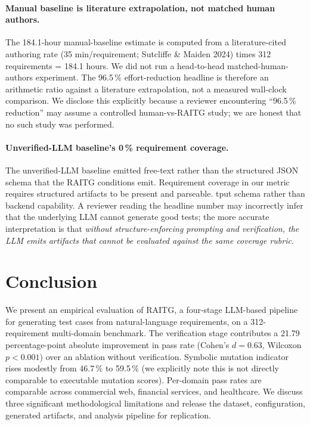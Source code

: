 \documentclass[10pt,twocolumn,letterpaper]{article}
\begin{document}
\paragraph{Manual baseline is literature extrapolation, not matched
human authors.} The 184.1-hour manual-baseline estimate is computed from a literature-cited
authoring rate (35 min/requirement; Sutcliffe \& Maiden 2024) times
312 requirements = 184.1 hours. We did not run a head-to-head
matched-human-authors experiment. The 96.5\,\% effort-reduction
headline is therefore an arithmetic ratio against a literature
extrapolation, not a measured wall-clock comparison. We disclose this
explicitly because a reviewer encountering ``96.5\,\% reduction'' may
assume a controlled human-vs-RAITG study; we are honest that no such
study was performed.

\paragraph{Unverified-LLM baseline's 0\,\% requirement coverage.} The
unverified-LLM baseline emitted free-text rather than the structured
JSON schema that the RAITG conditions emit. Requirement coverage in
our metric requires structured artifacts to be present and parseable.
tput schema rather than backend capability. A reviewer reading the
headline number may incorrectly infer that the underlying LLM cannot
generate good tests; the more accurate interpretation is that
\emph{without structure-enforcing prompting and verification, the LLM
emits artifacts that cannot be evaluated against the same coverage
rubric}.

\section{Conclusion}
\label{sec:conclusion}

We present an empirical evaluation of RAITG, a four-stage LLM-based
pipeline for generating test cases from natural-language requirements,
on a 312-requirement multi-domain benchmark. The verification stage
contributes a 21.79 percentage-point absolute improvement in pass
rate (Cohen's $d = 0.63$, Wilcoxon $p < 0.001$) over an ablation
without verification. Symbolic mutation indicator rises modestly from
46.7\,\% to 59.5\,\% (we explicitly note this is not directly
comparable to executable mutation scores). Per-domain pass rates are
comparable across commercial web, financial services, and healthcare.
We discuss three significant methodological limitations and release
the dataset, configuration, generated artifacts, and analysis
pipeline for replication.
\end{document}

